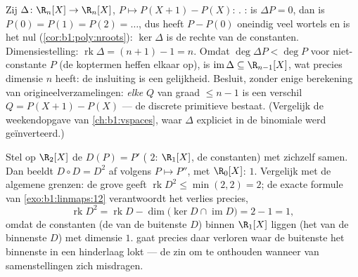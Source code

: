 \begin{example}
\label{ex:b1:linmaps:delta}
Zij $\Delta \colon \R_n[X] \to \R_n[X]$, $P \mapsto P(X+1) -
P(X)$: . : is $\Delta P = 0$, dan is $P(0) = P(1) =
P(2) = \dots$, dus heeft $P - P(0)$ oneindig veel wortels en is
het nul (\cref{cor:b1:poly:nroots}): $\ker\Delta$ is de rechte van
de constanten. Dimensiestelling: $\operatorname{rk}\Delta = (n +
1) - 1 = n$. Omdat $\deg \Delta P < \deg P$ voor niet-constante
$P$ (de koptermen heffen elkaar op), is $\operatorname{im}\Delta
\subseteq \R_{n-1}[X]$, wat precies dimensie $n$ heeft: de
insluiting is een gelijkheid. Besluit, zonder enige berekening van
origineelverzamelingen: \emph{elke}  $Q$ van graad $\leq n
- 1$ is een verschil $Q = P(X+1) - P(X)$ --- de discrete
primitieve bestaat. (Vergelijk de weekendopgave van
\cref{ch:b1:vspaces}, waar $\Delta$ expliciet in de binomiale
 werd geïnverteerd.)
\end{example}

\begin{example}
\label{ex:b1:linmaps:rankbookkeeping}
Stel op $\R_2[X]$ de  $D(P) = P'$ ( $2$: 
$\R_1[X]$,  de constanten) met zichzelf samen. Dan beeldt $D
\circ D = D^2$ af volgens $P \mapsto P''$, met  $\R_0[X]$:
 $1$. Vergelijk met de algemene grenzen: de grove geeft
$\operatorname{rk} D^2 \leq \min(2, 2) = 2$; de exacte formule van
\cref{exo:b1:linmaps:12} verantwoordt het verlies precies,
\[
\operatorname{rk} D^2 = \operatorname{rk} D -
\dim\bigl(\ker D \cap \operatorname{im} D\bigr) = 2 - 1 = 1 ,
\]
omdat de constanten (de  van de buitenste $D$) binnen
$\R_1[X]$ liggen (het  van de binnenste $D$) met dimensie
$1$.  gaat precies daar verloren waar de buitenste  het
binnenste  in een hinderlaag lokt --- de zin om te onthouden
wanneer  van samenstellingen zich misdragen.
\end{example}

